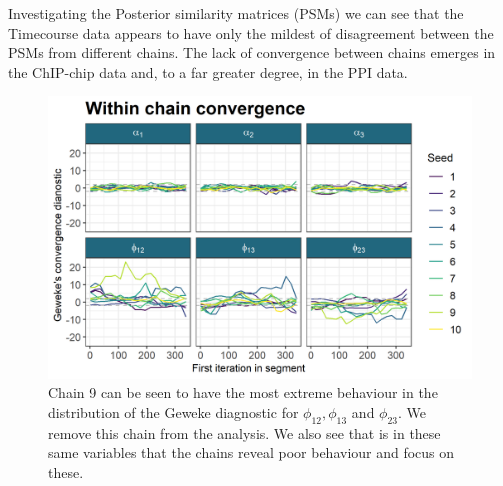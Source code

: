 \documentclass[]{article}
\begin{document}
Investigating the Posterior similarity matrices (PSMs) we can see that the Timecourse data appears to have only the mildest of disagreement between the PSMs from different chains. The lack of convergence between chains emerges in the ChIP-chip data and, to a far greater degree, in the PPI data.

\begin{figure}
	\centering
	\includegraphics[scale=1.0]{../Images/Yeast/Convergence/gewekePlot.png}
	\caption{Chain 9 can be seen to have the most extreme behaviour in the distribution of the Geweke diagnostic for $\phi_{12}, \phi_{13}$ and $\phi_{23}$. We remove this chain from the analysis. We also see that is in these same variables that the chains reveal poor behaviour and focus on these.}
	\label{fig:gewekePlot}
\end{figure}
\end{document}
